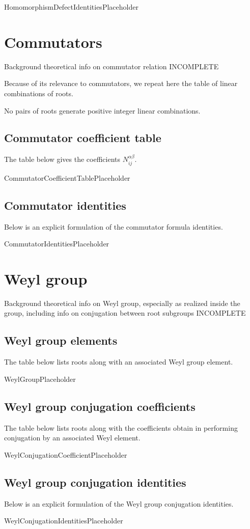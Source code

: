 \documentclass[11pt]{article}
\newcommand{\noi}{\noindent}
\theoremstyle{definition}
\begin{document}
HomomorphismDefectIdentitiesPlaceholder

\newpage
\section{Commutators}

\noi Background theoretical info on commutator relation INCOMPLETE

\noi Because of its relevance to commutators, we repeat here the table of linear combinations of roots.

\noindent No pairs of roots generate positive integer linear combinations.


\subsection{Commutator coefficient table}

\noi The table below gives the coefficients $N_{ij}^{\alpha\beta}$.

CommutatorCoefficientTablePlaceholder

\subsection{Commutator identities}

\noi Below is an explicit formulation of the commutator formula identities.

CommutatorIdentitiesPlaceholder

\newpage
\section{Weyl group}

\noi Background theoretical info on Weyl group, especially as realized inside the group, including info on conjugation between root subgroups INCOMPLETE

\subsection{Weyl group elements}

\noi The table below lists roots along with an associated Weyl group element.

WeylGroupPlaceholder

\subsection{Weyl group conjugation coefficients}

\noi The table below lists roots along with the coefficients obtain in performing conjugation by an associated Weyl element.

WeylConjugationCoefficientPlaceholder

\subsection{Weyl group conjugation identities}

\noi Below is an explicit formulation of the Weyl group conjugation identities.

WeylConjugationIdentitiesPlaceholder
\end{document}
